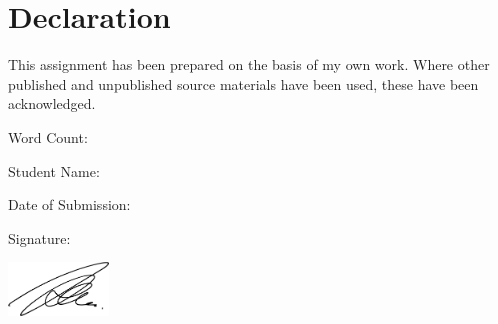 \chapter*{Declaration}
\thispagestyle{empty}

This assignment has been prepared on the basis of my own work. Where other published and unpublished source materials have been used, these have been acknowledged.

\vfill

Word Count: \wordCount

\vspace{0.4em}

Student Name: \studentName

\vspace{0.4em}

Date of Submission: \submitDate

\vspace{0.4em}

Signature:

\includegraphics[width=0.2\textwidth]{./images/root/signature.png}

